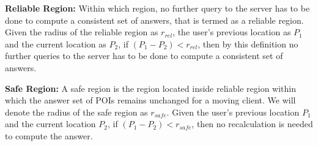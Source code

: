 \documentclass{sig-alternate}
\begin{document}
\begin{defn}
\textbf{Reliable Region:} Within which region, no further query to the server has to be done to compute a consistent set of answers, that is termed as a reliable region. Given the radius of the reliable region as $r_{rel}$, the user's previous location as $P_1$ and the current location as $P_2$, if $(P_1 - P_2) < r_{rel}$, then by this definition no further queries to the server has to be done to compute a consistent set of answers.
\end{defn}

\begin{defn}
\textbf{Safe Region:} A safe region is the region located inside reliable region within which the answer set of POIs remains unchanged for a moving client. We will denote the radius of the safe region as $r_{safe}$. Given the user's previous location $P_1$ and the current location $P_2$, if $(P_1 - P_2) < r_{safe}$, then no recalculation is needed to compute the answer.
\end{defn}
\end{document}
